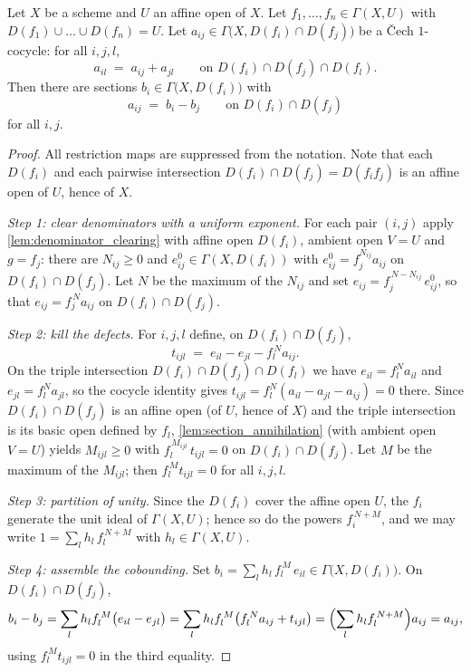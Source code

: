 \begin{theorem}
  \label{thm:affine_open_cech_cobounding}
  \leanok
  Let \(X\) be a scheme and \(U\) an affine open of \(X\). Let \(f_1, \dots, f_n \in
  \Gamma(X, U)\) with \(D(f_1) \cup \dots \cup D(f_n) = U\). Let
  \(a_{ij} \in \Gamma\bigl(X, D(f_i) \cap D(f_j)\bigr)\) be a \v{C}ech \(1\)-cocycle: for all
  \(i, j, l\),
  \[
    a_{il} \;=\; a_{ij} + a_{jl}
    \qquad \text{on } D(f_i) \cap D(f_j) \cap D(f_l).
  \]
  Then there are sections \(b_i \in \Gamma\bigl(X, D(f_i)\bigr)\) with
  \[
    a_{ij} \;=\; b_i - b_j \qquad \text{on } D(f_i) \cap D(f_j)
  \]
  for all \(i, j\).
\end{theorem}
\begin{proof}
  \leanok
  All restriction maps are suppressed from the notation. Note that each \(D(f_i)\) and each
  pairwise intersection \(D(f_i) \cap D(f_j) = D(f_i f_j)\) is an affine open of \(U\), hence
  of \(X\).

  \emph{Step 1: clear denominators with a uniform exponent.} For each pair \((i,j)\) apply
  \ref{lem:denominator_clearing} with affine open \(D(f_i)\), ambient open \(V = U\) and
  \(g = f_j\): there are \(N_{ij} \ge 0\) and \(e^0_{ij} \in \Gamma(X, D(f_i))\) with
  \(e^0_{ij} = f_j^{N_{ij}} a_{ij}\) on \(D(f_i) \cap D(f_j)\). Let \(N\) be the maximum of
  the \(N_{ij}\) and set \(e_{ij} = f_j^{\,N - N_{ij}}\, e^0_{ij}\), so that
  \(e_{ij} = f_j^{\,N} a_{ij}\) on \(D(f_i) \cap D(f_j)\).

  \emph{Step 2: kill the defects.} For \(i, j, l\) define, on \(D(f_i) \cap D(f_j)\),
  \[
    t_{ijl} \;=\; e_{il} - e_{jl} - f_l^{\,N} a_{ij}.
  \]
  On the triple intersection \(D(f_i) \cap D(f_j) \cap D(f_l)\) we have
  \(e_{il} = f_l^N a_{il}\) and \(e_{jl} = f_l^N a_{jl}\), so the cocycle identity gives
  \(t_{ijl} = f_l^N (a_{il} - a_{jl} - a_{ij}) = 0\) there. Since
  \(D(f_i) \cap D(f_j)\) is an affine open (of \(U\), hence of \(X\)) and the triple
  intersection is its basic open defined by \(f_l\), \ref{lem:section_annihilation} (with
  ambient open \(V = U\)) yields \(M_{ijl} \ge 0\) with
  \(f_l^{\,M_{ijl}}\, t_{ijl} = 0\) on \(D(f_i) \cap D(f_j)\). Let \(M\) be the maximum of
  the \(M_{ijl}\); then \(f_l^{\,M} t_{ijl} = 0\) for all \(i,j,l\).

  \emph{Step 3: partition of unity.} Since the \(D(f_i)\) cover the affine open \(U\), the
  \(f_i\) generate the unit ideal of \(\Gamma(X, U)\); hence so do the powers
  \(f_i^{\,N+M}\), and we may write \(1 = \sum_l h_l\, f_l^{\,N+M}\) with
  \(h_l \in \Gamma(X, U)\).

  \emph{Step 4: assemble the cobounding.} Set
  \(b_i = \sum_l h_l\, f_l^{\,M}\, e_{il} \in \Gamma\bigl(X, D(f_i)\bigr)\). On
  \(D(f_i) \cap D(f_j)\),
  \[
    b_i - b_j
      = \sum_l h_l f_l^{\,M} \bigl(e_{il} - e_{jl}\bigr)
      = \sum_l h_l f_l^{\,M} \bigl(f_l^{\,N} a_{ij} + t_{ijl}\bigr)
      = \Bigl(\sum_l h_l f_l^{\,N+M}\Bigr) a_{ij}
      = a_{ij},
  \]
  using \(f_l^{\,M} t_{ijl} = 0\) in the third equality.
\end{proof}

